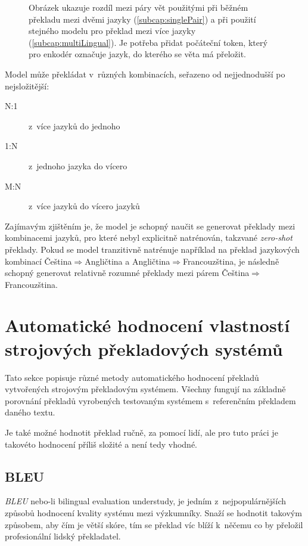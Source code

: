 \begin{figure}[H]
	\caption{Obrázek ukazuje rozdíl mezi páry vět použitými při běžném překladu mezi dvěmi jazyky (\ref{subcap:singlePair}) a při použití stejného modelu pro překlad mezi více jazyky (\ref{subcap:multiLingual}). Je potřeba přidat počáteční token, který pro enkodér označuje jazyk, do kterého se věta má přeložit.}
	\label{figure:multiLingDataset}
\end{figure}

Model může překládat v~různých kombinacích, seřazeno od nejjednodušší po nejsložitější:
\begin{description}
  \item[N:1] z~více jazyků do jednoho
  \item[1:N] z~jednoho jazyka do vícero
  \item[M:N] z~více jazyků do vícero jazyků
\end{description}

Zajímavým zjištěním je, že model je schopný naučit se generovat překlady mezi kombinacemi jazyků, pro které nebyl explicitně natrénován, takzvané \emph{zero-shot} překlady. Pokud se model tranzitivně natrénuje například na překlad jazykových kombinací Čeština$\Rightarrow$Angličtina a Angličtina$\Rightarrow$Francouzština, je následně schopný generovat relativně rozumné překlady mezi párem Čeština$\Rightarrow$Francouzština.


\section{Automatické hodnocení vlastností strojových překladových systémů}
Tato sekce popisuje různé metody automatického hodnocení překladů vytvořených strojovým překladovým systémem. Všechny fungují na základně porovnání překladů vyrobených testovaným systémem s~referenčním překladem daného textu.

Je také možné hodnotit překlad ručně, za pomocí lidí, ale pro tuto práci je takovéto hodnocení příliš složité a není tedy vhodné.

\subsection{BLEU} \label{subsection:bleu}
\emph{BLEU} \cite{BLEU} nebo-li bilingual evaluation understudy, je jedním z~nejpopulárnějších způsobů hodnocení kvality systému mezi výzkumníky. Snaží se hodnotit takovým způsobem, aby čím je větší skóre, tím se překlad víc blíží k~něčemu co by přeložil profesionální lidský překladatel.


